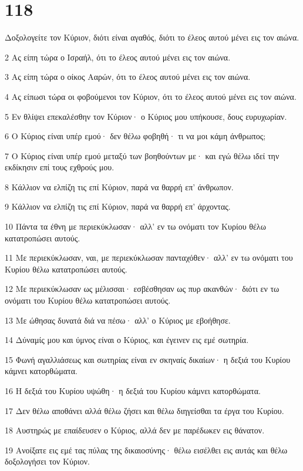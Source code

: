 \chapter{118}

\par Δοξολογείτε τον Κύριον, διότι είναι αγαθός, διότι το έλεος αυτού μένει εις τον αιώνα.
\par 2 Ας είπη τώρα ο Ισραήλ, ότι το έλεος αυτού μένει εις τον αιώνα.
\par 3 Ας είπη τώρα ο οίκος Ααρών, ότι το έλεος αυτού μένει εις τον αιώνα.
\par 4 Ας είπωσι τώρα οι φοβούμενοι τον Κύριον, ότι το έλεος αυτού μένει εις τον αιώνα.
\par 5 Εν θλίψει επεκαλέσθην τον Κύριον· ο Κύριος μου υπήκουσε, δους ευρυχωρίαν.
\par 6 Ο Κύριος είναι υπέρ εμού· δεν θέλω φοβηθή· τι να μοι κάμη άνθρωπος;
\par 7 Ο Κύριος είναι υπέρ εμού μεταξύ των βοηθούντων με· και εγώ θέλω ιδεί την εκδίκησιν επί τους εχθρούς μου.
\par 8 Κάλλιον να ελπίζη τις επί Κύριον, παρά να θαρρή επ' άνθρωπον.
\par 9 Κάλλιον να ελπίζη τις επί Κύριον, παρά να θαρρή επ' άρχοντας.
\par 10 Πάντα τα έθνη με περιεκύκλωσαν· αλλ' εν τω ονόματι τον Κυρίου θέλω κατατροπώσει αυτούς.
\par 11 Με περιεκύκλωσαν, ναι, με περιεκύκλωσαν πανταχόθεν· αλλ' εν τω ονόματι του Κυρίου θέλω κατατροπώσει αυτούς.
\par 12 Με περιεκύκλωσαν ως μέλισσαι· εσβέσθησαν ως πυρ ακανθών· διότι εν τω ονόματι του Κυρίου θέλω κατατροπώσει αυτούς.
\par 13 Με ώθησας δυνατά διά να πέσω· αλλ' ο Κύριος με εβοήθησε.
\par 14 Δύναμίς μου και ύμνος είναι ο Κύριος, και έγεινεν εις εμέ σωτηρία.
\par 15 Φωνή αγαλλιάσεως και σωτηρίας είναι εν σκηναίς δικαίων· η δεξιά του Κυρίου κάμνει κατορθώματα.
\par 16 Η δεξιά του Κυρίου υψώθη· η δεξιά του Κυρίου κάμνει κατορθώματα.
\par 17 Δεν θέλω αποθάνει αλλά θέλω ζήσει και θέλω διηγείσθαι τα έργα του Κυρίου.
\par 18 Αυστηρώς με επαίδευσεν ο Κύριος, αλλά δεν με παρέδωκεν εις θάνατον.
\par 19 Ανοίξατε εις εμέ τας πύλας της δικαιοσύνης· θέλω εισέλθει εις αυτάς και θέλω δοξολογήσει τον Κύριον.

